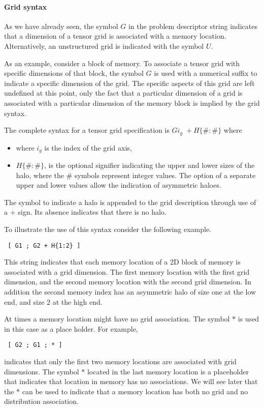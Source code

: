 \paragraph{Grid syntax}
As we have already seen, the symbol $G$ in the problem descriptor string indicates that a dimension of a tensor grid is associated with a memory location. Alternatively, an unstructured grid is indicated with the symbol $U$.

As an example, consider a block of memory. To associate a tensor grid with specific dimensions of that block, the symbol $G$ is used with a numerical  suffix  to indicate a specific dimension of the grid. The specific aspects of this grid are left undefined at this point, only the fact that a particular dimension of a grid is associated with a particular dimension of the memory block is implied by the grid syntax. 

The complete syntax for a tensor grid specification is $G i_g \; + H \{ \# : \# \}$ where
\begin{itemize}
	\item where $i_g$ is the index of the grid axis,
	\item $H \{ \# : \# \}$, is the optional signifier indicating the upper and lower sizes of the halo, where the $\#$ symbols represent integer values. The option of a separate upper and lower values allow the indication of asymmetric haloes.
\end{itemize}
The symbol to indicate a halo is appended to the grid description through use of a $+$ sign. Its absence indicates that there is no halo.

To illustrate the use of this syntax consider the following example.
\begin{center}
\begin{verbatim}
 [ G1 ; G2 + H{1:2} ]
\end{verbatim}
\end{center}
This string indicates that each memory location of a 2D block of memory is associated with a grid dimension. The first memory location with the first grid dimension, and the second memory location with the second grid dimension. In addition the second memory index has an asymmetric halo of size one at the low end, and size 2 at the high end.

At times a memory location might have no grid association. The symbol $\ast$ is used in this case as a place holder. For example, 
\begin{center}
\begin{verbatim}
 [ G2 ; G1 ; * ]
\end{verbatim}
\end{center}
indicates that only the first two memory locations are associated with grid dimensions. The symbol $\ast$ located in the last memory location is a placeholder that indicates that location in memory has no associations. We will see later that the $\ast$ can be used to indicate that a memory location has both no grid and no distribution association. 

